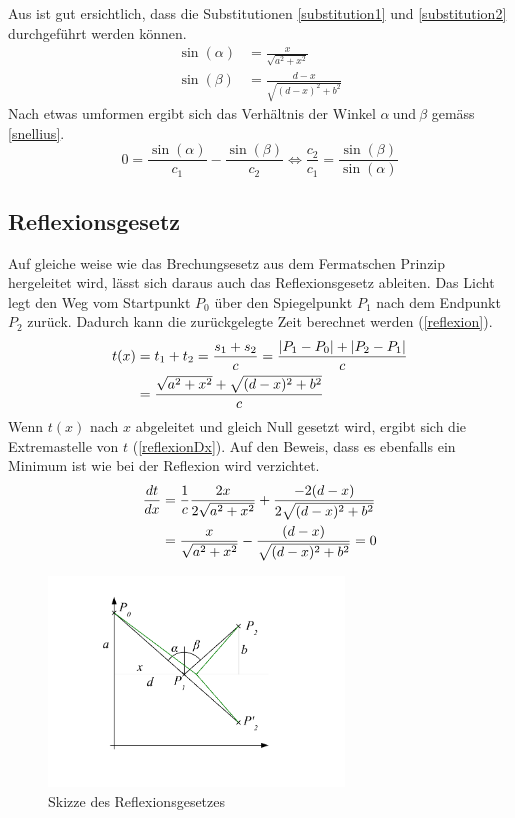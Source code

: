 Aus  ist gut ersichtlich, dass die Substitutionen \ref{substitution1} und \ref{substitution2} durchgeführt werden können.
\begin{align}
	\sin(\alpha) &= \frac{x}{\sqrt{a^2 + x^2}}  \label{substitution1}\\
	\sin(\beta) &= \frac{d-x}{\sqrt{(d -x)^2 + b^2}} \label{substitution2}
\end{align}
Nach etwas umformen ergibt sich das Verhältnis der Winkel $\alpha \ \text{und} \ \beta$ gemäss \eqref{snellius}.
\begin{equation}
	0 = \frac{\sin(\alpha)}{c_1} - \frac{\sin(\beta)}{c_2} \Leftrightarrow\frac{c_2}{c_1} = \frac{\sin(\beta)}{\sin(\alpha)}
	\label{snellius}
\end{equation}
\subsection{Reflexionsgesetz}
Auf gleiche weise wie das Brechungsesetz aus dem Fermatschen Prinzip hergeleitet wird, 
lässt sich daraus auch das Reflexionsgesetz ableiten.
Das Licht legt den Weg vom Startpunkt $P_0$ über den Spiegelpunkt $P_1$ 
nach dem Endpunkt $P_2$ zurück. Dadurch kann die zurückgelegte Zeit berechnet werden \cite{Wikipedia} (\eqref{reflexion}).
\begin{align}
t(x) &= t_1 + t_2 = \frac{s_1 + s_2}{c} = \frac{|P_1 - P_0| + |P_2 - P_1|}{c} \notag \\
&= \frac{\sqrt{a^2 + x^2} + \sqrt{(d-x)^2 + b^2}}{c} \label{reflexion}
\end{align}
Wenn $t(x)$ nach $x$ abgeleitet und gleich Null gesetzt wird, ergibt sich die Extremastelle  von $t$ (\eqref{reflexionDx}). Auf den Beweis, dass es ebenfalls ein Minimum ist wie bei der Reflexion wird verzichtet.
\begin{align}
\frac{dt}{dx} &= \frac{1}{c}  \frac{2  x}{2  \sqrt{a^2 + x^2}} + \frac{-2  (d-x)}{2  \sqrt{(d-x)^2 + b^2}} \notag \\
&= \frac{x}{ \sqrt{a^2 + x^2}} - \frac{(d-x)}{ \sqrt{(d-x)^2 + b^2}} = 0 \label{reflexionDx}
\end{align}
\begin{figure}[H]
\begin{center}
	\includegraphics[width=0.7\textwidth]{./picture/Spiegelung.pdf}
	\caption{Skizze des Reflexionsgesetzes}
	\label{Ab:spiegelung}
\end{center}
\end{figure}

